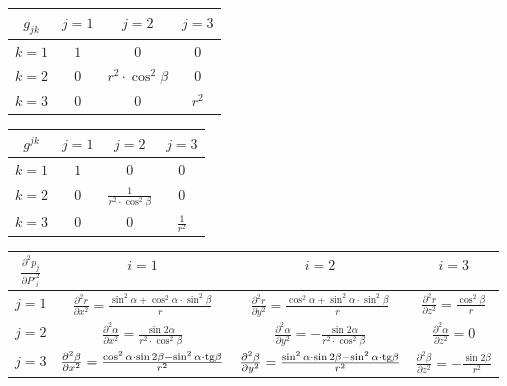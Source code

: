 \begin{tabular}{| c || c | c | c |}
\hline
\(g_{jk}\) & \(j=1\) & \(j=2\) & \(j=3\) \\
\hline
\hline
\(k=1\) & \(1\) & \(0\) & \(0\) \\
\hline
\(k=2\) & \(0\) & \(r^2 \cdot \cos^2 \beta\) & \(0\) \\
\hline
\(k=3\) & \(0\) & \(0\) & \(r^2\) \\
\hline
\end{tabular}

\begin{tabular}{| c || c | c | c |}
\hline
\(g^{jk}\) & \(j=1\) & \(j=2\) & \(j=3\) \\
\hline
\hline
\(k=1\) & \(1\) & \(0\) & \(0\) \\
\hline
\(k=2\) & \(0\) & \(\frac{1}{r^2 \cdot \cos^2 \beta}\) & \(0\) \\
\hline
\(k=3\) & \(0\) & \(0\) & \(\frac{1}{r^2}\) \\
\hline
\end{tabular}

\begin{tabular}{| c || c | c | c |}
\hline
\(\frac{\partial^2 p_j}{\partial P'^2_i}\) & \(i=1\) & \(i=2\) & \(i=3\) \\
\hline
\hline
\(j=1\) & \(\frac{\partial^2 r}{\partial x^2} = \frac{\sin^2 \alpha + \cos^2 \alpha \cdot \sin^2 \beta}{r}\) & \(\frac{\partial^2 r}{\partial y^2} = \frac{\cos^2 \alpha + \sin^2 \alpha \cdot \sin^2 \beta}{r}\) & \(\frac{\partial^2 r}{\partial z^2} = \frac{\cos^2 \beta}{r}\) \\
\hline
\(j=2\) & \(\frac{\partial^2 \alpha}{\partial x^2} = \frac{\sin 2\alpha}{r^2 \cdot \cos^2 \beta}\) & \(\frac{\partial^2 \alpha}{\partial y^2} = -\frac{\sin 2\alpha}{r^2 \cdot \cos^2 \beta}\) & \(\frac{\partial^2 \alpha}{\partial z^2} = 0\) \\
\hline
\(j=3\) & \(\frac{\partial^2 \beta}{\partial x^2} = \frac{\cos^2 \alpha \cdot \sin 2 \beta - \sin^2 \alpha \cdot \mathrm{tg} \beta}{r^2}\) & \(\frac{\partial^2 \beta}{\partial y^2} = \frac{\sin^2 \alpha \cdot \sin 2 \beta - \sin^2 \alpha \cdot \mathrm{tg} \beta}{r^2}\) & \(\frac{\partial^2 \beta}{\partial z^2} = -\frac{\sin 2 \beta}{r^2}\) \\
\hline
\end{tabular}
